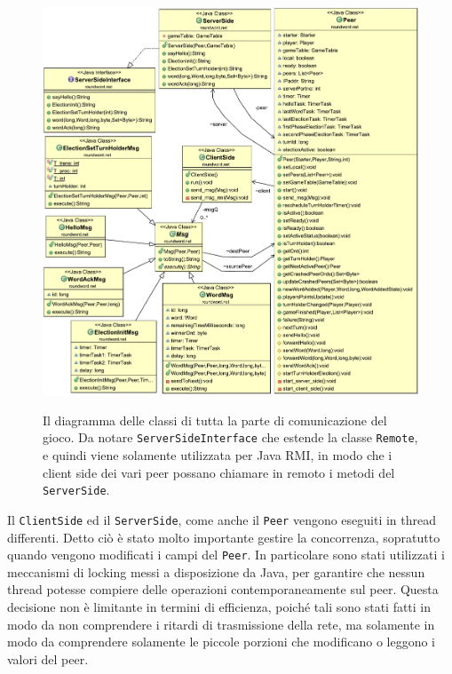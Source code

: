 \documentclass[10.5pt]{article}
\begin{document}
\begin{figure}
	\vspace*{-0.5in}
	\begin{center}
		\hspace*{-0.45in}
		\includegraphics[scale=0.75]{imgs/ClassDiagram2.pdf}
		\label{fig:class_diagram2}
		\caption{Il diagramma delle classi di tutta la parte di comunicazione del gioco. Da notare \texttt{ServerSideInterface} che estende la classe \texttt{Remote}, e quindi viene solamente utilizzata per Java RMI, in modo che i client side dei vari peer possano chiamare in remoto i metodi del \texttt{ServerSide}.}
	\end{center}
\end{figure}

Il \texttt{ClientSide} ed il \texttt{ServerSide}, come anche il \texttt{Peer} vengono eseguiti in thread differenti. Detto ciò è stato molto importante gestire la concorrenza, sopratutto quando vengono modificati i campi del \texttt{Peer}. In particolare sono stati utilizzati i meccanismi di locking messi a disposizione da Java, per garantire che nessun thread potesse compiere delle operazioni contemporaneamente sul peer. Questa decisione non è limitante in termini di efficienza, poiché tali sono stati fatti in modo da non comprendere i ritardi di trasmissione della rete, ma solamente in modo da comprendere solamente le piccole porzioni che modificano o leggono i valori del peer.
\end{document}

